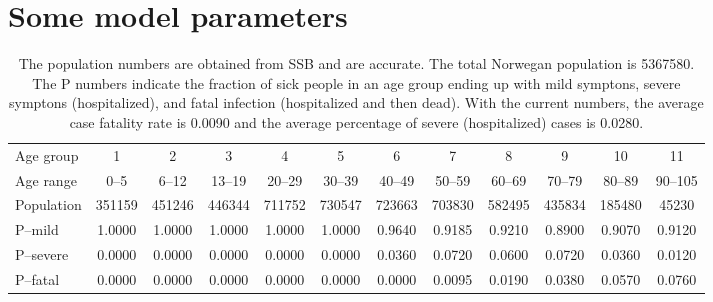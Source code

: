 \documentclass[twoside,11pt]{article}
\begin{document}
\clearpage
\newpage
\section{Some model parameters}
\begin{table}[htb]
\begin{center}
\small
\tabcolsep=3.5pt
\begin{tabular}{lccccccccccc}
\hline
 Age group & 1      & 2      & 3      & 4      & 5      & 6      & 7      & 8      & 9      & 10     & 11      \\
 Age range & 0--5   & 6--12  & 13--19 & 20--29 & 30--39 & 40--49 & 50--59 & 60--69 & 70--79 & 80--89 & 90--105 \\
 Population& 351159 & 451246 & 446344 & 711752 & 730547 & 723663 & 703830 & 582495 & 435834 & 185480 & 45230   \\
 P--mild   & 1.0000 & 1.0000 & 1.0000 & 1.0000 & 1.0000 & 0.9640 & 0.9185 & 0.9210 & 0.8900 & 0.9070 &  0.9120 \\
 P--severe & 0.0000 & 0.0000 & 0.0000 & 0.0000 & 0.0000 & 0.0360 & 0.0720 & 0.0600 & 0.0720 & 0.0360 &  0.0120 \\
 P--fatal  & 0.0000 & 0.0000 & 0.0000 & 0.0000 & 0.0000 & 0.0000 & 0.0095 & 0.0190 & 0.0380 & 0.0570 &  0.0760 \\
\hline
\end{tabular}
\end{center}
\caption{
The population numbers are obtained from SSB and are accurate. The total Norwegan population is 5367580.
The P numbers indicate the fraction of sick people in an age group ending up with mild symptons, severe symptons (hospitalized),
and fatal infection (hospitalized and then dead). With the current numbers, the average case fatality rate is 0.0090 and
the average percentage of severe (hospitalized) cases is 0.0280.
\label{tab:age}}
\end{table}
%
\end{document}
